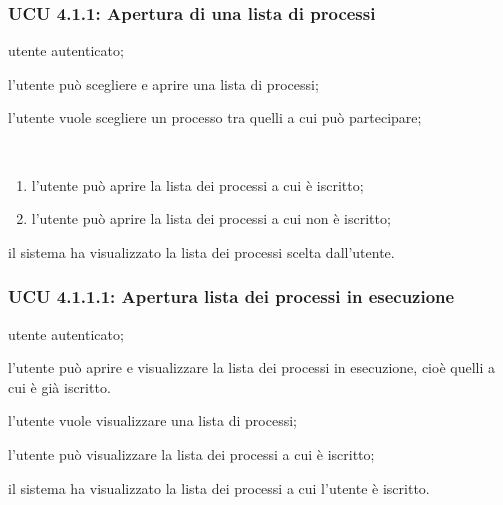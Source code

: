 \subsubsection{UCU 4.1.1: Apertura di una lista di processi}
\begin{description}[leftmargin=0cm]
\item[Attori:] utente autenticato;
\item[Descrizione:] l'utente può scegliere e aprire una lista di processi;
\item[Precondizione:] l'utente vuole scegliere un processo tra quelli a cui può partecipare;
\item[Scenario principale:]\
\begin{enumerate}
\item l'utente può aprire la lista dei processi a cui è iscritto;
\item l'utente può aprire la lista dei processi a cui non è iscritto;
\end{enumerate}
\item[Postcondizione:] il sistema ha visualizzato la lista dei processi scelta dall'utente.
\end{description}

\subsubsection{UCU 4.1.1.1: Apertura lista dei processi in esecuzione}
\begin{description}[leftmargin=0cm]
\item[Attori:] utente autenticato;
\item[Descrizione:] l'utente può aprire e visualizzare la lista dei processi in esecuzione, cioè quelli a cui è già iscritto. 
\item[Precondizione:] l'utente vuole visualizzare una lista di processi;
\item[Scenario principale:] l'utente può visualizzare la lista dei processi a cui è iscritto;
\item[Postcondizione:] il sistema ha visualizzato la lista dei processi a cui l'utente è iscritto.
\end{description}

